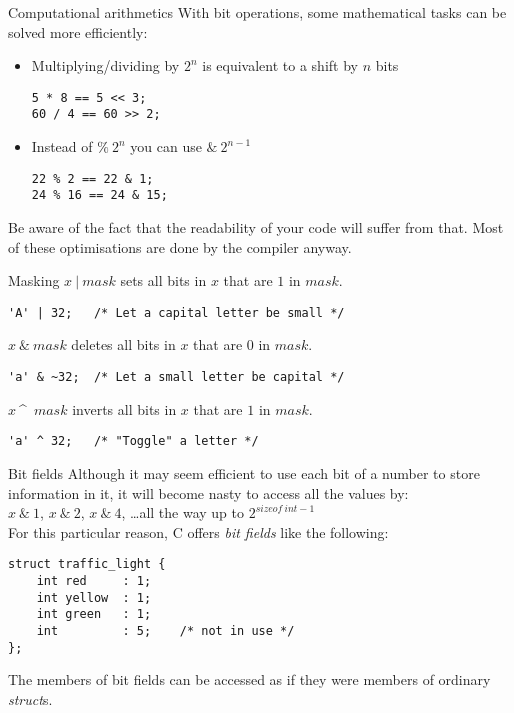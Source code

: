 
\begin{frame}[fragile]{Computational arithmetics}
	With bit operations, some mathematical tasks can be solved more efficiently:
	\begin{itemize}
		\item Multiplying/dividing by $2^n$ is equivalent to a shift by $n$ bits
		\begin{lstlisting}
5 * 8 == 5 << 3;
60 / 4 == 60 >> 2;
\end{lstlisting}
		\item Instead of $\%\ 2^n$ you can use $\&\ 2^{n-1}$ 
		\begin{lstlisting}
22 % 2 == 22 & 1;
24 % 16 == 24 & 15;
\end{lstlisting}
	\end{itemize}\bigskip
	Be aware of the fact that the readability of your code will suffer from that. Most of these optimisations are done by the compiler anyway.
\end{frame}


\begin{frame}[fragile]{Masking}
	$x\ |\ mask$ sets all bits in $x$ that are $1$ in $mask$.\\
	\begin{lstlisting}
'A' | 32;	/* Let a capital letter be small */
\end{lstlisting}\bigskip
	$x\ \&\ mask$ deletes all bits in $x$ that are $0$ in $mask$.\\
	\begin{lstlisting}
'a' & ~32;	/* Let a small letter be capital */
\end{lstlisting}\bigskip
	$x\ $\textasciicircum\ $mask$ inverts all bits in $x$ that are $1$ in $mask$.\\
	\begin{lstlisting}
'a' ^ 32;	/* "Toggle" a letter */
\end{lstlisting}
\end{frame}


\begin{frame}[fragile]{Bit fields}
	Although it may seem efficient to use each bit of a number to store information in it, it will become nasty to access all the values by:\\
	$x\ \&\ 1$, $x\ \&\ 2$, $x\ \&\ 4$, \dots all the way up to $2^{sizeof\ int - 1}$\\
	\bigskip
	For this particular reason, C offers \textit{bit fields} like the following:
	\begin{lstlisting}
struct traffic_light {
	int red		: 1;
	int yellow	: 1;
	int green	: 1;
	int			: 5;	/* not in use */
};
\end{lstlisting}
	The members of bit fields can be accessed as if they were members of ordinary \textit{struct}s.

\end{frame}



